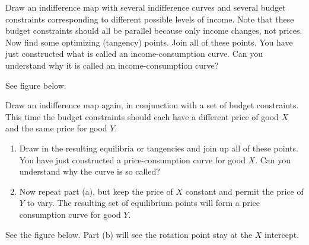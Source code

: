 \begin{enumialphparenastyle}
\begin{econex}
\begin{econsolution}
\end{econsolution}
\end{econex}

\begin{econex}\label{ex:ch6ex9}
Draw an indifference map with several indifference curves and several budget constraints corresponding to different possible levels of income. Note that these budget constraints should all be parallel because only income changes, not prices. Now find some optimizing (tangency) points. Join all of these points. You have just constructed what is called an income-consumption curve. Can you understand why it is called an income-consumption curve?
\begin{econsolution}
See figure below.

\begin{center*}
\end{center*}
\end{econsolution}
\end{econex}

\begin{econex}\label{ex:ch6ex10}
Draw an indifference map again, in conjunction with a set of budget constraints. This time the budget constraints should each have a different price of good $X$ and the same price for good $Y$.
\begin{enumerate}
\item	Draw in the resulting equilibria or tangencies and join up all of these points. You have just constructed a price-consumption curve for good $X$. Can you understand why the curve is so called?
\item	Now repeat part (a), but keep the price of $X$ constant and permit the price of $Y$ to vary. The resulting set of equilibrium points will form a price consumption curve for good $Y$.
\end{enumerate}
\begin{econsolution}
See the figure below. Part (b) will see the rotation point stay at the $X$ intercept.


\end{econsolution}
\end{econex}
\end{enumialphparenastyle}
